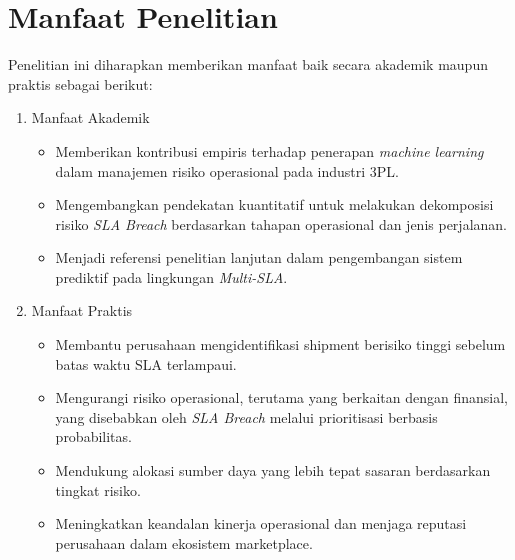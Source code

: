 \section{Manfaat Penelitian}
\label{sec:manfaat}
Penelitian ini diharapkan memberikan manfaat baik secara akademik maupun praktis sebagai berikut:
\begin{enumerate}
    \item Manfaat Akademik
    
\begin{itemize}
    \item Memberikan kontribusi empiris terhadap penerapan \textit{machine learning} dalam manajemen risiko operasional pada industri 3PL.
    \item Mengembangkan pendekatan kuantitatif untuk melakukan dekomposisi risiko \textit{SLA Breach} berdasarkan tahapan operasional dan jenis perjalanan.
    \item Menjadi referensi penelitian lanjutan dalam pengembangan sistem prediktif pada lingkungan \textit{Multi-SLA}.
\end{itemize}

\item Manfaat Praktis

\begin{itemize}
    \item Membantu perusahaan mengidentifikasi shipment berisiko tinggi sebelum batas waktu SLA terlampaui.
    \item Mengurangi risiko operasional, terutama yang berkaitan dengan finansial, yang disebabkan oleh  \textit{SLA Breach} melalui prioritisasi berbasis probabilitas.
    \item Mendukung alokasi sumber daya yang lebih tepat sasaran berdasarkan tingkat risiko.
    \item Meningkatkan keandalan kinerja operasional dan menjaga reputasi perusahaan dalam ekosistem marketplace.
\end{itemize}
\end{enumerate}


